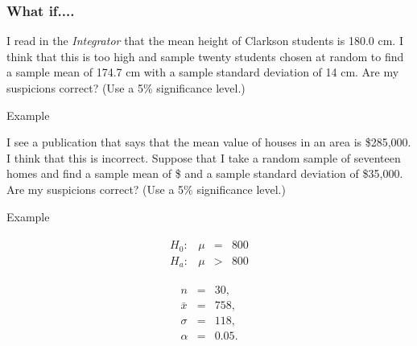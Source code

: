 \begin{frame}
  \frametitle{What if....}


  I read in the \textit{Integrator} that the mean height of Clarkson
  students is 180.0 cm. I think that this is too high and sample
  twenty students chosen at random to find a sample mean of 174.7 cm
  with a {\color{red}sample} standard deviation of 14 cm. Are my
  suspicions correct?  (Use a 5\% significance level.)

    \vfill
    
\end{frame}




\begin{frame}{Example}

  I see a publication that says that the mean value of houses in an
  area is \$285,000. I think that this is incorrect.  Suppose that I
  take a random sample of seventeen homes and find a sample mean of \$
  and a sample standard deviation of \$35,000. Are my suspicions
  correct?  (Use a 5\% significance level.)

  \vfill

\end{frame}


\begin{frame}{Example}

    \begin{eqnarray*}
      \begin{array}{lrcl}
        H_0: & \mu & = & 800 \\
        H_a: & \mu & > & 800
      \end{array}
    \end{eqnarray*}

    \begin{eqnarray*}
      n & = & 30, \\
      \bar{x} & = & 758,\\
      \sigma & = & 118, \\
      \alpha & = & 0.05.
    \end{eqnarray*}


\end{frame}



